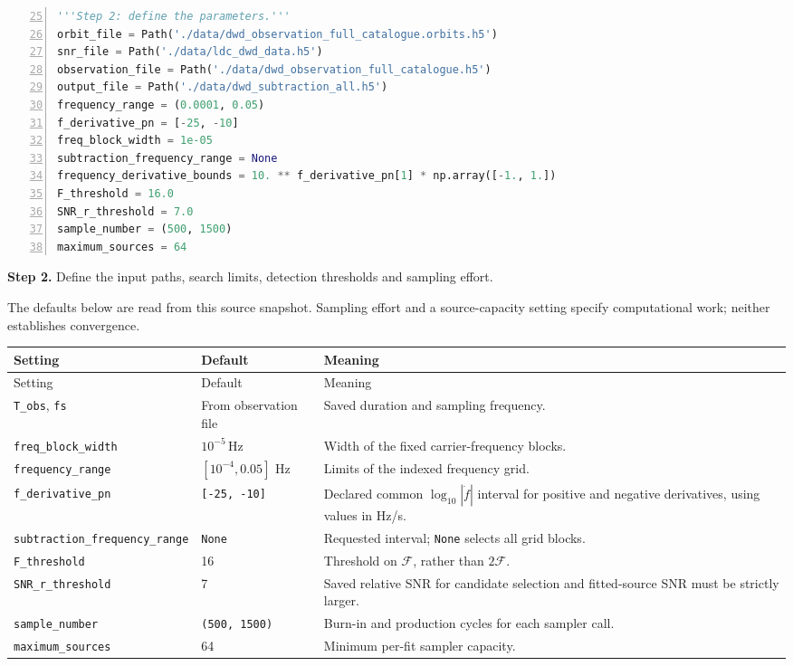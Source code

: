 \documentclass[11pt,a4paper]{article}
\newcommand{\code}[1]{\texttt{\nolinkurl{#1}}}
\newcommand{\Hz}{\,\mathrm{Hz}}
\begin{document}
\begin{lstlisting}[language=Python,firstnumber=25,numbers=left,numberblanklines=true,showlines=true]
'''Step 2: define the parameters.'''
orbit_file = Path('./data/dwd_observation_full_catalogue.orbits.h5')
snr_file = Path('./data/ldc_dwd_data.h5')
observation_file = Path('./data/dwd_observation_full_catalogue.h5')
output_file = Path('./data/dwd_subtraction_all.h5')
frequency_range = (0.0001, 0.05)
f_derivative_pn = [-25, -10]
freq_block_width = 1e-05
subtraction_frequency_range = None
frequency_derivative_bounds = 10. ** f_derivative_pn[1] * np.array([-1., 1.])
F_threshold = 16.0
SNR_r_threshold = 7.0
sample_number = (500, 1500)
maximum_sources = 64
\end{lstlisting}

\textbf{Step 2.} Define the input paths, search limits,
detection thresholds and sampling effort.




The defaults below are read from this source snapshot. Sampling effort and a
source-capacity setting specify computational work; neither establishes convergence.

{\small
\begin{longtable}{P{0.31\textwidth}P{0.22\textwidth}P{0.39\textwidth}}
\toprule Setting & Default & Meaning\\\midrule
\endfirsthead
\toprule Setting & Default & Meaning\\\midrule
\endhead
\code{T_obs}, \code{fs} & From observation file & Saved duration and sampling frequency.\\
\code{freq_block_width} & \(10^{-5}\Hz\) & Width of the fixed carrier-frequency blocks.\\
\code{frequency_range} & \([10^{-4},0.05]\) Hz & Limits of the indexed frequency grid.\\
\code{f_derivative_pn} & \code{[-25, -10]} & Declared common \(\log_{10}|\dot f|\) interval for positive and negative derivatives, using values in Hz/s.\\
\code{subtraction_frequency_range} & \code{None} & Requested interval; \code{None} selects all grid blocks.\\
\code{F_threshold} & 16 & Threshold on \(\mathcal F\), rather than \(2\mathcal F\).\\
\code{SNR_r_threshold} & 7 & Saved relative SNR for candidate selection and fitted-source SNR must be strictly larger.\\
\code{sample_number} & \code{(500, 1500)} & Burn-in and production cycles for each sampler call.\\
\code{maximum_sources} & 64 & Minimum per-fit sampler capacity.\\
\bottomrule
\end{longtable}}
\end{document}
